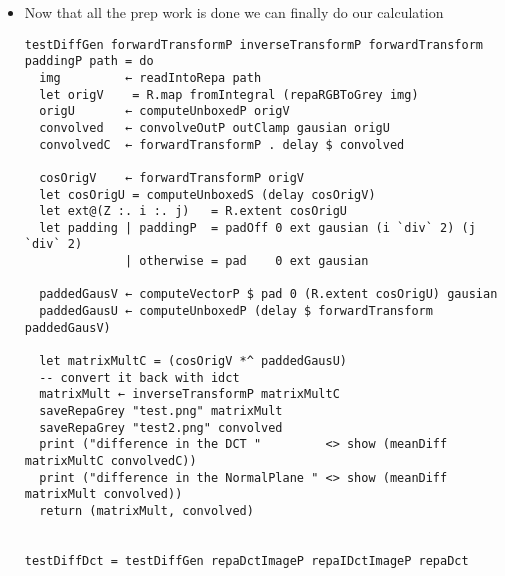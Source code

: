 \documentclass{article}
\begin{document}
\begin{itemize}
\begin{itemize}
\item There are two pad's, padOff allows the user to specify where they
want their original vector to be in the padded vector.
\end{itemize}
\begin{verbatim}
meanDiff :: (Source r c, Fractional c, Source r2 c) ⇒ Array r DIM2 c → Array r2 DIM2 c → c
meanDiff arr1 = (/ fromIntegral (i * j)) . sumAllS . R.zipWith (\x y → abs (x - y)) arr1
  where Z :. i :. j = R.extent arr1
\end{verbatim}
\begin{itemize}
\item Here we are simply taking two arrays and subtracting every place
then sum up the 2d Vector then dividing by the length of the
array. Really this is a simple difference calculation
\end{itemize}
\item Now that all the prep work is done we can finally do our calculation
\begin{verbatim}
testDiffGen forwardTransformP inverseTransformP forwardTransform paddingP path = do
  img         ← readIntoRepa path
  let origV    = R.map fromIntegral (repaRGBToGrey img)
  origU       ← computeUnboxedP origV
  convolved   ← convolveOutP outClamp gausian origU
  convolvedC  ← forwardTransformP . delay $ convolved

  cosOrigV    ← forwardTransformP origV
  let cosOrigU = computeUnboxedS (delay cosOrigV)
  let ext@(Z :. i :. j)   = R.extent cosOrigU
  let padding | paddingP  = padOff 0 ext gausian (i `div` 2) (j `div` 2)
              | otherwise = pad    0 ext gausian

  paddedGausV ← computeVectorP $ pad 0 (R.extent cosOrigU) gausian
  paddedGausU ← computeUnboxedP (delay $ forwardTransform paddedGausV)

  let matrixMultC = (cosOrigV *^ paddedGausU)
  -- convert it back with idct
  matrixMult ← inverseTransformP matrixMultC
  saveRepaGrey "test.png" matrixMult
  saveRepaGrey "test2.png" convolved
  print ("difference in the DCT "         <> show (meanDiff matrixMultC convolvedC))
  print ("difference in the NormalPlane " <> show (meanDiff matrixMult convolved))
  return (matrixMult, convolved)


testDiffDct = testDiffGen repaDctImageP repaIDctImageP repaDct


\end{verbatim}
\end{itemize}
\end{document}
